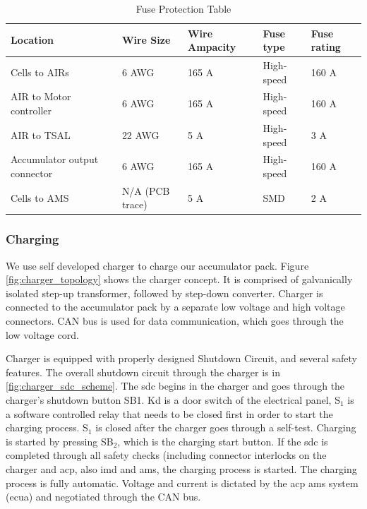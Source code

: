 

\begin{table}[H]
	\centering
	\caption{Fuse Protection Table}
	\begin{tabu}{|X|X|X|X|X|}
		\hline
		Location & Wire Size & Wire Ampacity & Fuse type & Fuse rating\\
		\hline
		Cells to AIRs & 6 AWG & 165 A & High-speed & 160 A \\
		\hline
		AIR to Motor controller & 6 AWG & 165 A & High-speed & 160 A \\
		\hline
		AIR to TSAL & 22 AWG & 5 A & High-speed & 3 A \\
		\hline
		Accumulator output connector & 6 AWG & 165 A & High-speed  & 160 A \\
		\hline
		Cells to AMS & N/A (PCB trace) & 5 A    & SMD    & 2 A \\
		\hline
	\end{tabu}%
	\label{tab:acc-fuse-protection}%
\end{table}%

\subsubsection{Charging}
We use self developed charger to charge our accumulator pack. Figure \ref{fig:charger_topology} shows the charger concept. It is comprised of galvanically isolated step-up transformer, followed by step-down converter. Charger is connected to the accumulator pack by a separate low voltage and high voltage connectors. CAN bus is used for data communication, which goes through the low voltage cord. 

Charger is equipped with properly designed Shutdown Circuit, and several safety features. The overall shutdown circuit through the charger is in \ref{fig:charger_sdc_scheme}. The \gls{sdc} begins in the charger and goes through the charger's shutdown button SB1. Kd is a door switch of the electrical panel, S$_1$ is a software controlled relay that needs to be closed first in order to start the charging process. S$_1$ is closed after the charger goes through a self-test. Charging is started by pressing SB$_2$, which is the charging start button. If the \gls{sdc} is completed through all safety checks (including connector interlocks on the charger and \gls{acp}, also \gls{imd} and \gls{ams}, the charging process is started. The charging process is fully automatic. Voltage and current is dictated by the \gls{acp} \gls{ams} system (\gls{ecua}) and negotiated through the CAN bus.

